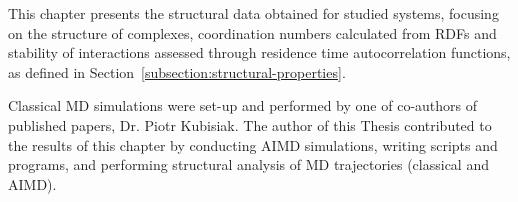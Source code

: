 \label{chapter:structural-md}

This chapter presents the structural data obtained for studied systems, focusing on the structure of complexes, coordination numbers calculated from RDFs and stability of interactions assessed through residence time autocorrelation functions, as defined in Section~\ref{subsection:structural-properties}.

Classical MD simulations were set-up and performed by one of co-authors of published papers, Dr. Piotr Kubisiak. The author of this Thesis contributed to the results of this chapter by conducting AIMD simulations, writing scripts and programs, and performing structural analysis of MD trajectories (classical and AIMD).